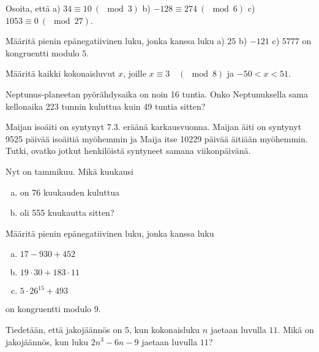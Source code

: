 \begin{kotitehtavasivu}

\begin{tehtava}
	Osoita, että a) $34 \equiv 10\ (\mod 3)$ b) $-128 \equiv 274\ (\mod 6)$ c) $1053 \equiv 0\ (\mod 27)$.
\end{tehtava}

\begin{tehtava}
	Määritä pienin epänegatiivinen luku, jonka kanssa luku a) $25$ b) $-121$ c) $5777$ on kongruentti modulo $5$.
\end{tehtava}

\begin{tehtava}
	Määritä kaikki kokonaisluvut $x$, joille $x \equiv 3\quad (\mod 8)$ ja $-50 < x < 51$.
\end{tehtava}

\begin{tehtava}
	Neptunus-planeetan pyörähdysaika on noin 16 tuntia. Onko Neptunuksella sama kellonaika 223 tunnin kuluttua kuin 49 tuntia sitten?
\end{tehtava}

\begin{tehtava}
	Maijan isoäiti on syntynyt 7.3. eräänä karkausvuonna. Maijan äiti on syntynyt 9525 päivää isoäitiä myöhemmin ja Maija itse 10229 päivää äitiään myöhemmin. Tutki, ovatko jotkut henkilöistä syntyneet samana viikonpäivänä.
\end{tehtava}

\begin{tehtava}
	Nyt on tammikuu. Mikä kuukausi
	\begin{enumerate}[a)]
	\item on 76 kuukauden kuluttua
	\item oli 555 kuukautta sitten?
	\end{enumerate}
\end{tehtava}

\begin{tehtava}
	Määritä pienin epänegatiivinen luku, jonka kanssa luku
	\begin{enumerate}[a)]
	\item $17 - 930 + 452$
	\item $19 \cdot 30 + 183 \cdot 11$
	\item $5 \cdot 26^{15} + 493$
	\end{enumerate}
	on kongruentti modulo 9.
\end{tehtava}

\begin{tehtava}
	Tiedetään, että jakojäännös on $5$, kun kokonaisluku $n$ jaetaan luvulla $11$. Mikä on jakojäännös, kun luku $2n^3 - 6n - 9$ jaetaan luvulla $11$?
\end{tehtava}


\end{kotitehtavasivu}
